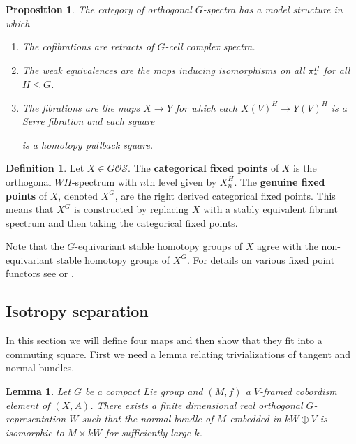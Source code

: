 \documentclass[11pt]{amsart}
\newcommand{\beforesubsection}{\vspace{1em}}
\newcommand{\aftersubsection}{}
\newcommand{\Osp}{\mathcal{OS}}
\theoremstyle{plain}   %
\newtheorem{lem}[thm]{Lemma}
\newtheorem{prop}[thm]{Proposition}
\theoremstyle{definition}
\newtheorem{df}[thm]{Definition}
\theoremstyle{remark}
\numberwithin{equation}{section}
\begin{document}
\begin{prop}\cite[III.4.2]{mandell2002equivariant} 
The category of orthogonal $G$-spectra has a model structure in which 
\begin{enumerate}
\item The cofibrations are retracts of $G$-cell complex spectra. 
\item The weak equivalences are the maps inducing isomorphisms on all $\pi_*^H$ for all $H\leq G$. 
\item The fibrations are the maps $X\to Y$ for which each $X(V)^H\to Y(V)^H$ is a Serre fibration and 	each square
\begin{figure}[H]
\center
{}
\end{figure}
is a homotopy pullback square. 
\end{enumerate}
\end{prop}
\fi






\begin{df}\label{df:genuine and categorical fixed points}
Let $X\in G\Osp$. The \textbf{categorical fixed points} of $X$ is the orthogonal $WH$-spectrum with $n$th level given by $X_n^H$. The \textbf{genuine fixed points} of $X$, denoted $X^G$, are the right derived categorical fixed points. This means that $X^G$ is constructed by replacing $X$ with a stably equivalent fibrant spectrum and then taking the categorical fixed points.
\end{df}

Note that the $G$-equivariant stable homotopy groups of $X$ agree with the non-equivariant stable homotopy groups of $X^G$. For details on various fixed point functors see \cite{hhr_book} or \cite{mandell2002equivariant}.

\beforesubsection
\subsection{Isotropy separation}\aftersubsection

In this section we will define four maps and then show that they fit into a commuting square. First we need a lemma relating trivializations of tangent and normal bundles.


\begin{lem}\label{lem:normal bundle}
Let $G$ be a compact Lie group and $(M,f)$ a $V$-framed cobordism element of $(X,A)$. There exists a finite dimensional real orthogonal $G$-representation $W$ such that the normal bundle of $M$ embedded in $kW\oplus V$ is isomorphic to $M\times kW$ for sufficiently large $k$. 
\end{lem}
\end{document}
